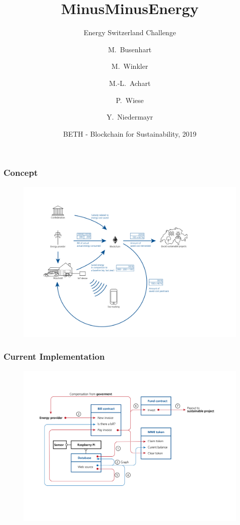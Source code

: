 \documentclass[t]{beamer}
\title{MinusMinusEnergy}
\subtitle{Energy Switzerland Challenge}
\author
{M.~Busenhart \and M.~Winkler \and M.-L.~Achart \\\and P.~Wiese \and Y.~Niedermayr}
\date[BETH 2019]
{BETH - Blockchain for Sustainability, 2019}
\begin{document}
  \frame{
    \titlepage
  }
  \begin{frame}
    \frametitle{Concept}
    \begin{figure}
    	\includegraphics[width=1\linewidth]{concept.png}
    \end{figure}
  \end{frame}

  \begin{frame}
		\frametitle{Current Implementation}
		\begin{figure}
			\includegraphics[width=1.1\linewidth]{implementation.png}
		\end{figure}
  \end{frame}
\end{document}
